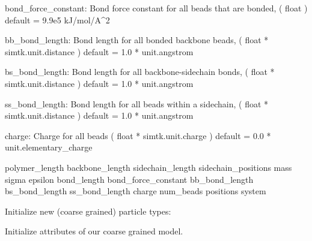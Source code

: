 \documentclass[letterpaper,10pt,english]{sphinxmanual}
\begin{document}
\begin{fulllineitems}
bond\_force\_constant: Bond force constant for all beads that are bonded,
( float )
default = 9.9e5 kJ/mol/A\textasciicircum{}2

bb\_bond\_length: Bond length for all bonded backbone beads,
( float * simtk.unit.distance )
default = 1.0 * unit.angstrom

bs\_bond\_length: Bond length for all backbone-sidechain bonds,
( float * simtk.unit.distance )
default = 1.0 * unit.angstrom

ss\_bond\_length: Bond length for all beads within a sidechain,
( float * simtk.unit.distance )
default = 1.0 * unit.angstrom

charge: Charge for all beads
( float * simtk.unit.charge )
default = 0.0 * unit.elementary\_charge

polymer\_length
backbone\_length
sidechain\_length
sidechain\_positions
mass
sigma
epsilon
bond\_length
bond\_force\_constant
bb\_bond\_length
bs\_bond\_length
ss\_bond\_length
charge
num\_beads
positions
system

\begin{fulllineitems}
\label{\detokenize{index:cg_model.cgmodel.CGModel.constrain_bonds}}
Initialize new (coarse grained) particle types:

\end{fulllineitems}


\begin{fulllineitems}
\label{\detokenize{index:cg_model.cgmodel.CGModel.positions}}
Initialize attributes of our coarse grained model.

\end{fulllineitems}


\end{fulllineitems}

\label{\detokenize{index:module-utilities.util}}
\end{document}
